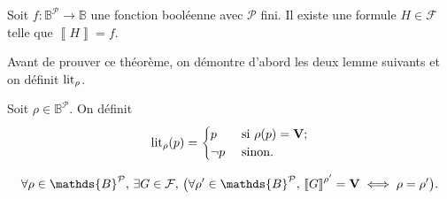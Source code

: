 \begin{thm}
	Soit $f: \mathds{B}^\mathcal{P} \to \mathds{B}$\/ une fonction booléenne avec $\mathcal{P}$\/ fini. Il existe une formule $H \in \mathcal{F}$\/ telle que $\left\llbracket H \right\rrbracket = f$.
\end{thm}

Avant de prouver ce théorème, on démontre d'abord les deux lemme suivants et on définit $\operatorname{lit}_\rho$.

\begin{defn}
	Soit $\rho \in \mathds{B}^\mathcal{P}$. On définit \[
		\operatorname{lit}_\rho(p) = \begin{cases}
			p &\text{ si } \rho(p) = {\mathbf{V}}\/ ;\\
			\lnot p &\text{ sinon}.
		\end{cases}
	\]
\end{defn}

\begin{lem}
	\[
		\forall \rho \in \mathds{B}^\mathcal{P},\,\exists G \in \mathcal{F},\,\big(
			\forall \rho' \in \mathds{B}^\mathcal{P},\,\left\llbracket G \right\rrbracket^{\rho'} = {\bfm V}\/  \iff \rho = \rho'\big)
	.\] 
\end{lem}

